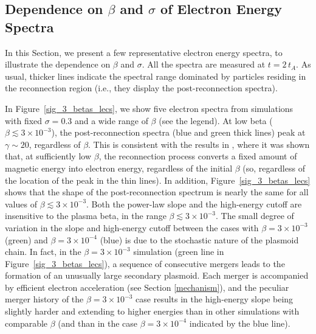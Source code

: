 \subsection{Dependence on $\beta$  and $\sigma$ of Electron Energy Spectra}\label{sec:5.2}
In this Section, we present a few representative electron energy spectra, to illustrate the dependence on $\beta$  and $\sigma$. All  the spectra are measured at $t=2\, t_{A}$. As usual, thicker lines indicate the spectral range dominated by particles residing in the reconnection region (i.e., they display the post-reconnection spectra). 

In Figure~\ref{sig_3_betas_lecs}, we show five electron spectra from simulations with fixed $\sigma=0.3$ and a wide range of $\beta$ (see the legend). 
At low beta ($\beta\lesssim 3\times 10^{-3}$), the post-reconnection spectra (blue and green thick lines) peak at $\gamma\sim 20$, regardless of $\beta$. This is consistent with the results in \citet{rowan2017}, where it was shown that, at sufficiently low $\beta$, the reconnection process converts a fixed amount of magnetic energy into electron energy, regardless of the initial $\beta$
(so, regardless of the location of the peak in the thin lines). In addition, Figure~\ref{sig_3_betas_lecs} shows that  the shape of the post-reconnection spectrum is nearly the same for all values of $\beta\lesssim 3\times10^{-3}$. Both the power-law slope and the high-energy cutoff are insensitive to the plasma beta, in the range $\beta\lesssim 3\times 10^{-3}$. The small degree of variation in the slope and high-energy cutoff between the cases with $\beta=3\times10^{-3}$ (green) and $\beta=3\times10^{-4}$ (blue) is due to the stochastic nature of the plasmoid chain. In fact, in the $\beta=3\times10^{-3}$ simulation (green line in Figure~\ref{sig_3_betas_lecs}), a sequence of consecutive mergers leads to the formation of an unusually large secondary plasmoid. Each merger is accompanied by efficient electron acceleration (see Section \ref{mechanism}), and the peculiar merger history of the $\beta=3\times10^{-3}$ case results in the high-energy slope being slightly harder and extending to higher energies than in other simulations with comparable $\beta$ (and than in the case $\beta=3\times10^{-4}$ indicated by the blue line).

